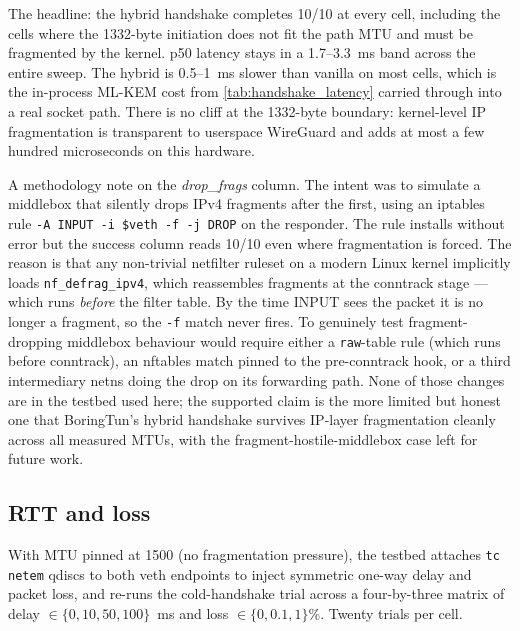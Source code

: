\documentclass[11pt,a4paper]{article}
\begin{document}
The headline: the hybrid handshake completes 10/10 at every cell, including the cells where the 1332-byte initiation does not fit the path MTU and must be fragmented by the kernel. p50 latency stays in a 1.7--3.3~ms band across the entire sweep. The hybrid is 0.5--1~ms slower than vanilla on most cells, which is the in-process ML-KEM cost from \cref{tab:handshake_latency} carried through into a real socket path. There is no cliff at the 1332-byte boundary: kernel-level IP fragmentation is transparent to userspace WireGuard and adds at most a few hundred microseconds on this hardware.

A methodology note on the \emph{drop\_frags} column. The intent was to simulate a middlebox that silently drops IPv4 fragments after the first, using an iptables rule \texttt{-A INPUT -i \$veth -f -j DROP} on the responder. The rule installs without error but the success column reads 10/10 even where fragmentation is forced. The reason is that any non-trivial netfilter ruleset on a modern Linux kernel implicitly loads \texttt{nf\_defrag\_ipv4}, which reassembles fragments at the conntrack stage --- which runs \emph{before} the filter table. By the time INPUT sees the packet it is no longer a fragment, so the \texttt{-f} match never fires. To genuinely test fragment-dropping middlebox behaviour would require either a \texttt{raw}-table rule (which runs before conntrack), an nftables match pinned to the pre-conntrack hook, or a third intermediary netns doing the drop on its forwarding path. None of those changes are in the testbed used here; the supported claim is the more limited but honest one that BoringTun's hybrid handshake survives IP-layer fragmentation cleanly across all measured MTUs, with the fragment-hostile-middlebox case left for future work.

\subsection{RTT and loss}
\label{sec:eval_rtt_loss}

With MTU pinned at 1500 (no fragmentation pressure), the testbed attaches \texttt{tc netem} qdiscs to both veth endpoints to inject symmetric one-way delay and packet loss, and re-runs the cold-handshake trial across a four-by-three matrix of delay $\in \{0, 10, 50, 100\}$~ms and loss $\in \{0, 0.1, 1\}\%$. Twenty trials per cell.
\end{document}
